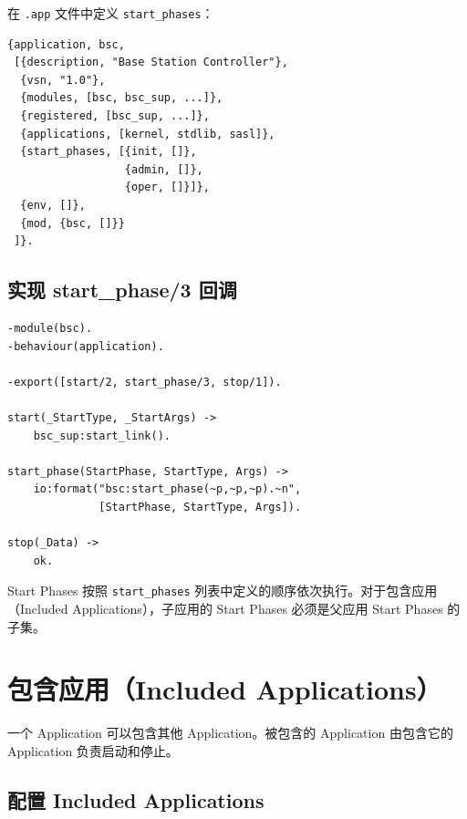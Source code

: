 \documentclass[a4paper,11pt]{article}
\begin{document}
在 \texttt{.app} 文件中定义 \texttt{start\_phases}：

\begin{lstlisting}[style=erlangstyle, caption={带 start\_phases 的 .app 文件}]
{application, bsc,
 [{description, "Base Station Controller"},
  {vsn, "1.0"},
  {modules, [bsc, bsc_sup, ...]},
  {registered, [bsc_sup, ...]},
  {applications, [kernel, stdlib, sasl]},
  {start_phases, [{init, []},
                  {admin, []},
                  {oper, []}]},
  {env, []},
  {mod, {bsc, []}}
 ]}.
\end{lstlisting}

\subsection{实现 start\_phase/3 回调}

\begin{lstlisting}[style=erlangstyle, caption={带 start\_phase 回调的 bsc.erl}]
-module(bsc).
-behaviour(application).

-export([start/2, start_phase/3, stop/1]).

start(_StartType, _StartArgs) ->
    bsc_sup:start_link().

start_phase(StartPhase, StartType, Args) ->
    io:format("bsc:start_phase(~p,~p,~p).~n",
              [StartPhase, StartType, Args]).

stop(_Data) ->
    ok.
\end{lstlisting}

\begin{notebox}
Start Phases 按照 \texttt{start\_phases} 列表中定义的顺序依次执行。对于包含应用（Included Applications），子应用的 Start Phases 必须是父应用 Start Phases 的子集。
\end{notebox}


\section{包含应用（Included Applications）}

一个 Application 可以包含其他 Application。被包含的 Application 由包含它的 Application 负责启动和停止。

\subsection{配置 Included Applications}
\end{document}
